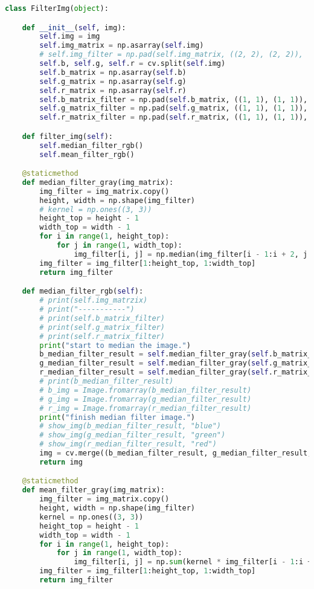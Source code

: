 \documentclass{hitreport}
\begin{document}
\begin{appendices}
\begin{lstlisting}[language=python]
class FilterImg(object):

    def __init__(self, img):
        self.img = img
        self.img_matrix = np.asarray(self.img)
        # self.img_filter = np.pad(self.img_matrix, ((2, 2), (2, 2)), 'constant', constant_values=(0, 0))
        self.b, self.g, self.r = cv.split(self.img)
        self.b_matrix = np.asarray(self.b)
        self.g_matrix = np.asarray(self.g)
        self.r_matrix = np.asarray(self.r)
        self.b_matrix_filter = np.pad(self.b_matrix, ((1, 1), (1, 1)), 'constant', constant_values=(0, 0))
        self.g_matrix_filter = np.pad(self.g_matrix, ((1, 1), (1, 1)), 'constant', constant_values=(0, 0))
        self.r_matrix_filter = np.pad(self.r_matrix, ((1, 1), (1, 1)), 'constant', constant_values=(0, 0))

    def filter_img(self):
        self.median_filter_rgb()
        self.mean_filter_rgb()

    @staticmethod
    def median_filter_gray(img_matrix):
        img_filter = img_matrix.copy()
        height, width = np.shape(img_filter)
        # kernel = np.ones((3, 3))
        height_top = height - 1
        width_top = width - 1
        for i in range(1, height_top):
            for j in range(1, width_top):
                img_filter[i, j] = np.median(img_filter[i - 1:i + 2, j - 1:j + 2].copy().reshape((1, -1))[0])
        img_filter = img_filter[1:height_top, 1:width_top]
        return img_filter

    def median_filter_rgb(self):
        # print(self.img_matrzix)
        # print("-----------")
        # print(self.b_matrix_filter)
        # print(self.g_matrix_filter)
        # print(self.r_matrix_filter)
        print("start to median the image.")
        b_median_filter_result = self.median_filter_gray(self.b_matrix_filter)
        g_median_filter_result = self.median_filter_gray(self.g_matrix_filter)
        r_median_filter_result = self.median_filter_gray(self.r_matrix_filter)
        # print(b_median_filter_result)
        # b_img = Image.fromarray(b_median_filter_result)
        # g_img = Image.fromarray(g_median_filter_result)
        # r_img = Image.fromarray(r_median_filter_result)
        print("finish median filter image.")
        # show_img(b_median_filter_result, "blue")
        # show_img(g_median_filter_result, "green")
        # show_img(r_median_filter_result, "red")
        img = cv.merge((b_median_filter_result, g_median_filter_result, r_median_filter_result))
        return img

    @staticmethod
    def mean_filter_gray(img_matrix):
        img_filter = img_matrix.copy()
        height, width = np.shape(img_filter)
        kernel = np.ones((3, 3))
        height_top = height - 1
        width_top = width - 1
        for i in range(1, height_top):
            for j in range(1, width_top):
                img_filter[i, j] = np.sum(kernel * img_filter[i - 1:i + 2, j - 1:j + 2]) // (3 ** 2)
        img_filter = img_filter[1:height_top, 1:width_top]
        return img_filter


\end{lstlisting}
\end{appendices}
\end{document}
